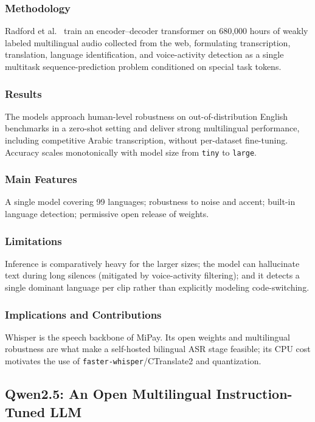 \subsubsection{Methodology}
Radford et al.~\cite{radford2023whisper} train an encoder--decoder transformer on
680{,}000 hours of weakly labeled multilingual audio collected from the web,
formulating transcription, translation, language identification, and
voice-activity detection as a single multitask sequence-prediction problem
conditioned on special task tokens.

\subsubsection{Results}
The models approach human-level robustness on out-of-distribution English
benchmarks in a zero-shot setting and deliver strong multilingual performance,
including competitive Arabic transcription, without per-dataset fine-tuning.
Accuracy scales monotonically with model size from \texttt{tiny} to
\texttt{large}.

\subsubsection{Main Features}
A single model covering 99 languages; robustness to noise and accent; built-in
language detection; permissive open release of weights.

\subsubsection{Limitations}
Inference is comparatively heavy for the larger sizes; the model can hallucinate
text during long silences (mitigated by voice-activity filtering); and it detects
a single dominant language per clip rather than explicitly modeling
code-switching.

\subsubsection{Implications and Contributions}
Whisper is the speech backbone of MiPay. Its open weights and multilingual
robustness are what make a self-hosted bilingual ASR stage feasible; its CPU cost
motivates the use of \texttt{faster-whisper}/CTranslate2 and quantization.

\subsection{Qwen2.5: An Open Multilingual Instruction-Tuned LLM}

